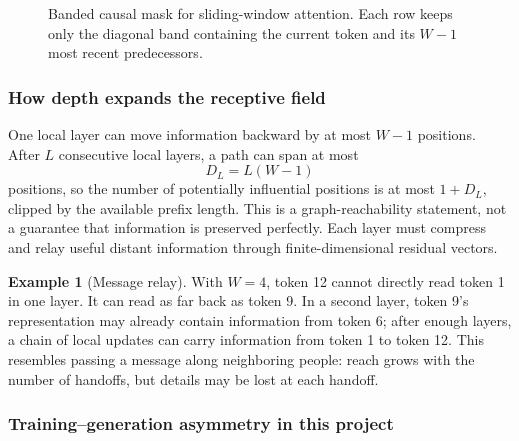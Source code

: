 \documentclass[11pt,a4paper]{article}
\theoremstyle{definition}
\newtheorem{example}{Example}[section]
\theoremstyle{plain}
\begin{document}
\begin{figure}[H]
\centering
{}
\caption{Banded causal mask for sliding-window attention. Each row keeps only the diagonal band containing the current token and its $W-1$ most recent predecessors.}
\label{fig:swa-band}
\end{figure}

\subsubsection{How depth expands the receptive field}

One local layer can move information backward by at most $W-1$ positions. After $L$ consecutive local layers, a path can span at most
\begin{equation}\label{eq:swa-receptive}
    D_L=L(W-1)
\end{equation}
positions, so the number of potentially influential positions is at most $1+D_L$, clipped by the available prefix length. This is a graph-reachability statement, not a guarantee that information is preserved perfectly. Each layer must compress and relay useful distant information through finite-dimensional residual vectors.

\begin{example}[Message relay]
With $W=4$, token 12 cannot directly read token 1 in one layer. It can read as far back as token 9. In a second layer, token 9's representation may already contain information from token 6; after enough layers, a chain of local updates can carry information from token 1 to token 12. This resembles passing a message along neighboring people: reach grows with the number of handoffs, but details may be lost at each handoff.
\end{example}

\subsubsection{Training--generation asymmetry in this project}
\end{document}
